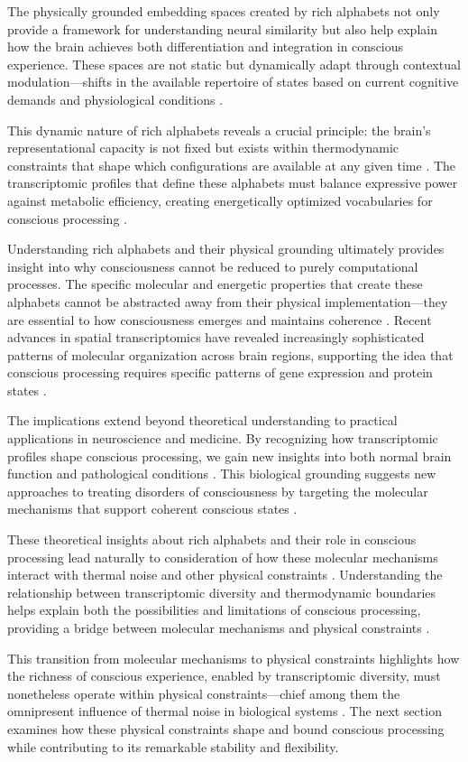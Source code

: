 The physically grounded embedding spaces created by rich alphabets not only provide a framework for understanding neural similarity but also help explain how the brain achieves both differentiation and integration in conscious experience. These spaces are not static but dynamically adapt through contextual modulation—shifts in the available repertoire of states based on current cognitive demands and physiological conditions \cite{lein2017promise}.

This dynamic nature of rich alphabets reveals a crucial principle: the brain's representational capacity is not fixed but exists within thermodynamic constraints that shape which configurations are available at any given time \cite{hawrylycz2016inferring}. The transcriptomic profiles that define these alphabets must balance expressive power against metabolic efficiency, creating energetically optimized vocabularies for conscious processing \cite{lake2016neuronal}.

Understanding rich alphabets and their physical grounding ultimately provides insight into why consciousness cannot be reduced to purely computational processes. The specific molecular and energetic properties that create these alphabets cannot be abstracted away from their physical implementation—they are essential to how consciousness emerges and maintains coherence \cite{siletti2023transcriptomic}. Recent advances in spatial transcriptomics have revealed increasingly sophisticated patterns of molecular organization across brain regions, supporting the idea that conscious processing requires specific patterns of gene expression and protein states \cite{macosko2015highly}.

The implications extend beyond theoretical understanding to practical applications in neuroscience and medicine. By recognizing how transcriptomic profiles shape conscious processing, we gain new insights into both normal brain function and pathological conditions \cite{nowakowski2017spatiotemporal}. This biological grounding suggests new approaches to treating disorders of consciousness by targeting the molecular mechanisms that support coherent conscious states \cite{yuste2020community}.

These theoretical insights about rich alphabets and their role in conscious processing lead naturally to consideration of how these molecular mechanisms interact with thermal noise and other physical constraints \cite{raj2008nature}. Understanding the relationship between transcriptomic diversity and thermodynamic boundaries helps explain both the possibilities and limitations of conscious processing, providing a bridge between molecular mechanisms and physical constraints \cite{zeisel2015cell}.

This transition from molecular mechanisms to physical constraints highlights how the richness of conscious experience, enabled by transcriptomic diversity, must nonetheless operate within physical constraints—chief among them the omnipresent influence of thermal noise in biological systems \cite{trapnell2015defining}. The next section examines how these physical constraints shape and bound conscious processing while contributing to its remarkable stability and flexibility.